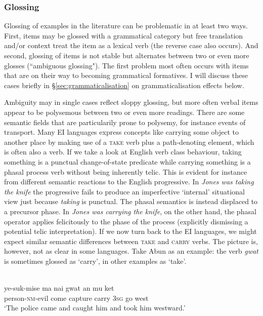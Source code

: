 \subsubsection{Glossing} \label{sec:verbglossing}

Glossing of examples in the literature can be problematic in at least two ways. First, items may be glossed with a grammatical category but free translation and/or context treat the item as a lexical verb (the reverse case also occurs). And second, glossing of items is not stable but alternates between two or even more glosses (``ambiguous glossing"). The first problem most often occurs with items that are on their way to becoming grammatical formatives. I will discuss these cases briefly in §\ref{sec:grammaticalisation} on grammaticalisation effects below.

Ambiguity may in single cases reflect sloppy glossing, but more often verbal items appear to be polysemous between two or even more readings. There are some semantic fields that are particularily prone to polysemy, for instance events of transport. Many EI languages express concepts like carrying some object to another place by making use of a \textsc{take} verb plus a path-denoting element, which is often also a verb. If we take a look at English verb class behaviour, taking something is a punctual change-of-state predicate while carrying something is a phasal process verb without being inherently telic. This is evident for instance from different semantic reactions to the English progressive. In \textit{Jones was taking the knife} the progressive fails to produce an imperfective `internal' situational view just because \textit{taking} is punctual. The phasal semantics is instead displaced to a precursor phase. In \textit{Jones was carrying the knife}, on the other hand, the phasal operator applies felicitously to the phase of the process (explicitly dismissing a potential telic interpretation). If we now turn back to the EI languages, we might expect similar semantic differences between \textsc{take} and \textsc{carry} verbs. The picture is, however, not as clear in some languages. Take Abun as an example: the verb \textit{gwat} is sometimes glossed as `carry', in other examples as `take'.

\ea \label{}
\\
\gll ye-suk-mise ma nai gwat an mu ket \\
person-\textsc{nm}-evil come capture carry 3\textsc{sg} go west \\
\glft `The police came and caught him and took him westward.'\\ 
\z

